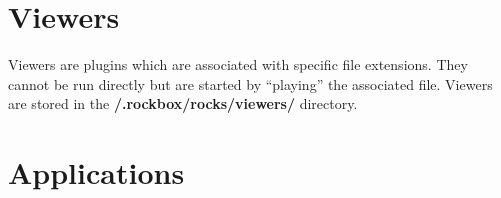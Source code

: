 
{}



\section{\label{ref:Viewersplugins}Viewers}

Viewers are plugins which are associated with specific file extensions.
They cannot be run directly but are started by ``playing''
the associated file. Viewers are stored in the
\textbf{/.rockbox/rocks/viewers/ }directory.

{}











{}

{}

{}

{}



\section{Applications}


